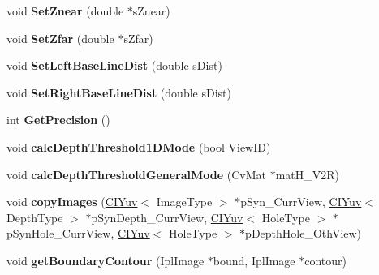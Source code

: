 \begin{DoxyCompactItemize}
void {\bfseries Set\+Znear} (double $\ast$s\+Znear)
\item 
\mbox{\label{class_c_boundary_noise_removal_abb48f5709da75e8d10b1accb1f43e252}} 
void {\bfseries Set\+Zfar} (double $\ast$s\+Zfar)
\item 
\mbox{\label{class_c_boundary_noise_removal_aa66294ebbddc519022b3108ee9571c85}} 
void {\bfseries Set\+Left\+Base\+Line\+Dist} (double s\+Dist)
\item 
\mbox{\label{class_c_boundary_noise_removal_a7c638bae81bc6c79a72d6728ba124d8a}} 
void {\bfseries Set\+Right\+Base\+Line\+Dist} (double s\+Dist)
\item 
\mbox{\label{class_c_boundary_noise_removal_ab519fd708fcbd7e88f7aa27416adab01}} 
int {\bfseries Get\+Precision} ()
\item 
\mbox{\label{class_c_boundary_noise_removal_a47c4e3561d8b501a4914308900ee6cab}} 
void {\bfseries calc\+Depth\+Threshold1\+D\+Mode} (bool View\+ID)
\item 
\mbox{\label{class_c_boundary_noise_removal_ace231492da43e38ee2806eddf4f1c367}} 
void {\bfseries calc\+Depth\+Threshold\+General\+Mode} (Cv\+Mat $\ast$mat\+H\+\_\+\+V2R)
\item 
\mbox{\label{class_c_boundary_noise_removal_ad7ecc5fae36a6a5bb878386519edee1a}} 
void {\bfseries copy\+Images} (\hyperlink{class_c_i_yuv}{C\+I\+Yuv}$<$ Image\+Type $>$ $\ast$p\+Syn\+\_\+\+Curr\+View, \hyperlink{class_c_i_yuv}{C\+I\+Yuv}$<$ Depth\+Type $>$ $\ast$p\+Syn\+Depth\+\_\+\+Curr\+View, \hyperlink{class_c_i_yuv}{C\+I\+Yuv}$<$ Hole\+Type $>$ $\ast$p\+Syn\+Hole\+\_\+\+Curr\+View, \hyperlink{class_c_i_yuv}{C\+I\+Yuv}$<$ Hole\+Type $>$ $\ast$p\+Depth\+Hole\+\_\+\+Oth\+View)
\item 
\mbox{\label{class_c_boundary_noise_removal_afe6b3861c20382f8ebadd61bc1069f92}} 
void {\bfseries get\+Boundary\+Contour} (Ipl\+Image $\ast$bound, Ipl\+Image $\ast$contour)
\item 

\end{DoxyCompactItemize}
